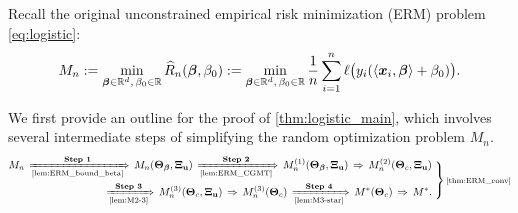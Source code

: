 Recall the original unconstrained empirical risk minimization (ERM) problem \cref{eq:logistic}:
\begin{equation}
\label{eq:ERM-0}
    M_n := 
    \min_{\text{\boldmath $\beta$} \in \mathbb{R}^d, \, \beta_0 \in \mathbb{R}} \widehat R_n(\text{\boldmath $\beta$}, \beta_0)
    :=
    \min_{\text{\boldmath $\beta$} \in \mathbb{R}^d, \, \beta_0 \in \mathbb{R}}  \frac1n \sum_{i=1}^n \ell\bigl( 
        y_i(\langle \text{\boldmath $x$}_i, \text{\boldmath $\beta$} \rangle +  \beta_0 )
     \bigr).
\end{equation}

\noindent
We first provide an outline for the proof of \cref{thm:logistic_main}, which involves several intermediate steps of simplifying the random optimization problem $M_n$.
\begin{equation*}
\begin{aligned}
    M_{n}
    \, \xRightarrow[\text{\cref{lem:ERM_bound_beta}}]{\textbf{Step 1}} \,
    M_n(\bTheta_{\vbeta}, \bXi_{\bu})
    \, \xRightarrow[\text{\cref{lem:ERM_CGMT}}]{\textbf{Step 2}} \, 
    M_n^{(1)}(\bTheta_{\vbeta}, \bXi_{\bu})
    \, \Rightarrow \,
    M_n^{(2)}(\bTheta_{c}, \bXi_{\bu}) 
    \\
    \, \xRightarrow[\text{\cref{lem:M2-3}}]{\textbf{Step 3}} \, 
    M_n^{(3)}(\bTheta_{c}, \bXi_{\bu})
    \, \Rightarrow \,
    M_n^{(3)}(\bTheta_{c}) 
    \, \xRightarrow[\text{\cref{lem:M3-star}}]{\textbf{Step 4}} \, 
    M^*(\bTheta_{c})
    \, \Rightarrow \,
    M^*.
\end{aligned}
\left.
\vphantom{\begin{matrix} \dfrac12 \\ \dfrac12 \end{matrix}}
\right\} \text{\scriptsize{\cref{thm:ERM_conv}}}
\end{equation*}

